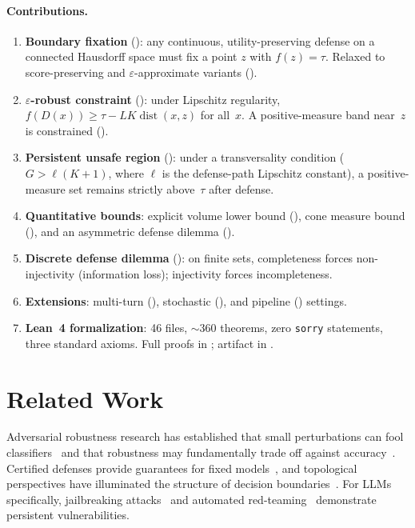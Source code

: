 \documentclass{article}
\newcommand{\dist}{\operatorname{dist}}
\begin{document}
\paragraph{Contributions.}
\begin{enumerate}[nosep]
  \item \textbf{Boundary fixation} (): any continuous,
    utility-preserving defense on a connected Hausdorff space must fix
    a point $z$ with $f(z) = \tau$. Relaxed to score-preserving and
    $\varepsilon$-approximate variants
    ().
  \item \textbf{$\varepsilon$-robust constraint} ():
    under Lipschitz regularity, $f(D(x)) \geq \tau - LK\dist(x,z)$
    for all~$x$. A positive-measure band near~$z$ is constrained
    ().
  \item \textbf{Persistent unsafe region} ():
    under a transversality condition ($G > \ell(K+1)$, where $\ell$ is
    the defense-path Lipschitz constant), a positive-measure set
    remains strictly above~$\tau$ after defense.
  \item \textbf{Quantitative bounds}: explicit volume lower bound
    (), cone measure bound (), and
    an asymmetric defense dilemma ().
  \item \textbf{Discrete defense dilemma} ():
    on finite sets, completeness forces non-injectivity (information
    loss); injectivity forces incompleteness.
  \item \textbf{Extensions}: multi-turn (),
    stochastic (), and pipeline
    () settings.
  \item \textbf{Lean~4 formalization}: 46 files, ${\sim}360$ theorems,
    zero \texttt{sorry} statements, three standard axioms. Full proofs
    in ; artifact in .
\end{enumerate}


\section{Related Work}
\label{sec:related}

Adversarial robustness research has established that small
perturbations can fool classifiers~\cite{szegedy2013intriguing,
goodfellow2014explaining,carlini2017evaluating,madry2018towards} and
that robustness may fundamentally trade off against
accuracy~\cite{tsipras2018robustness,fawzi2018adversarial}. Certified
defenses provide guarantees for fixed
models~\cite{cohen2019certified,katz2017reluplex,singh2019abstract,
huang2017safety,bagnall2019certifying}, and topological perspectives
have illuminated the structure of decision
boundaries~\cite{naitzat2020topology}. For LLMs specifically,
jailbreaking attacks~\cite{zou2023universal,chao2024jailbreaking,
mehrotra2024tree,greshake2023indirect} and automated
red-teaming~\cite{mouret2015illuminating,samvelyan2024rainbow}
demonstrate persistent vulnerabilities.
\end{document}
